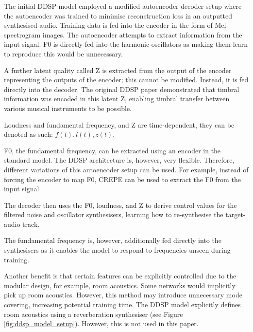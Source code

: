 The initial DDSP model\cite{OriginalDDSP} employed a modified autoencoder decoder setup where the autoencoder was trained to minimise reconstruction loss in an outputted synthesised audio. Training data is fed into the encoder in the form of Mel-spectrogram images. The autoencoder attempts to extract information from the input signal. F0 is directly fed into the harmonic oscillators as making them learn to reproduce this would be unnecessary.

A further latent quality called Z is extracted from the output of the encoder representing the outputs of the encoder; this cannot be modified. Instead, it is fed directly into the decoder. The original DDSP paper demonstrated that timbral information was encoded in this latent Z, enabling timbral transfer between various musical instruments to be possible.

Loudness and fundamental frequency, and Z are time-dependent, they can be denoted as such: $f(t), l(t), z(t)$.

F0, the fundamental frequency, can be extracted using an encoder in the standard model. The DDSP architecture is, however, very flexible. Therefore, different variations of this autoencoder setup can be used. For example, instead of forcing the encoder to map F0, CREPE can be used to extract the F0 from the input signal.

\vspace{0.5cm}
\vspace{0.5cm}

The decoder then uses the F0, loudness, and Z to derive control values for the filtered noise and oscillator synthesisers, learning how to re-synthesise the target-audio track.

The fundamental frequency is, however, additionally fed directly into the synthesisers as it enables the model to respond to frequencies unseen during training\cite{SingingDDSP}.

Another benefit is that certain features can be explicitly controlled due to the modular design, for example, room acoustics. Some networks would implicitly pick up room acoustics. However, this method may introduce unnecessary mode covering, increasing potential training time. The DDSP model explicitly defines room acoustics using a reverberation synthesiser (see Figure \ref{fig:ddsp_model_setup}). However, this is not used in this paper.

